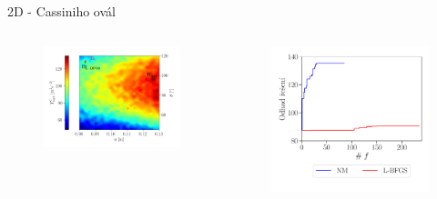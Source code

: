 \documentclass[aspectratio=169,xcolor=dvipsnames]{beamer}
\begin{document}
\begin{frame}{2D - Cassiniho ovál}
	\addtocounter{framenumber}{-1}
	\begin{columns}
		\begin{column}{.55\textwidth}
			\begin{figure}
				\includegraphics[width=1.1\linewidth, trim={0 0 1cm 9mm}, clip]{Images/2full.png}		
			\end{figure}
		\end{column}
		\begin{column}{.45\textwidth}
			\vspace{8mm}
			\begin{figure}
				\includegraphics[width=1.0\linewidth, trim={0 0 0 9mm}, clip]{Images/2.pdf}		

\end{figure}
\end{column}
\end{columns}
\end{frame}
\end{document}
